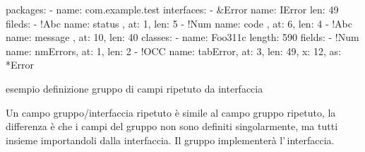 \documentclass[a4paper,10pt]{report}
\newif\ifesource
\newenvironment{elisting}[1][H]
  {\captionsetup{aboveskip=0pt}\begin{listing}[#1]}
  {\end{listing}%
}
\begin{document}
\ifesource
\begin{figure*}[!htb]
\begin{lstlisting}[language=yaml, 
caption={esempio definizione gruppo di campi ripetuto da interfaccia}, 
label=lst:xmplIOcc]
packages:
  - name: com.example.test
    interfaces:
      - &Error
        name: IError
        len: 49
        fields:
          - !Abc { name: status  , at:  1, len:  5 }
          - !Num { name: code    , at:  6, len:  4 }
          - !Abc { name: message , at: 10, len: 40 }
    classes:
      - name: Foo311c
        length: 590
        fields:
          - !Num { name: nmErrors, at: 1, len: 2}
          - !OCC { name: tabError, at: 3, len: 49, x: 12, as: *Error }
\end{lstlisting}
\end{figure*}
\else
\begin{elisting}[!htb]
\begin{yamlcode}
packages:
  - name: com.example.test
    interfaces:
      - &Error
        name: IError
        len: 49
        fileds:
          - !Abc { name: status  , at:  1, len:  5}
          - !Num { name: code    , at:  6, len:  4}
          - !Abc { name: message , at: 10, len: 40}
    classes:
      - name: Foo311c
        length: 590
        fields:
          - !Num { name: nmErrors, at: 1, len: 2}
          - !OCC { name: tabError, at: 3, len: 49, x: 12, as: *Error }
\end{yamlcode}
\caption{esempio definizione gruppo di campi ripetuto da interfaccia}
\label{lst:xmplIOcc}
\end{elisting}
\fi
Un campo gruppo/interfaccia ripetuto è simile al campo gruppo ripetuto, la 
differenza è che i campi del gruppo non sono definiti singolarmente, ma tutti 
insieme importandoli dalla interfaccia. Il gruppo implementerà l'\,interfaccia.
\end{document}
